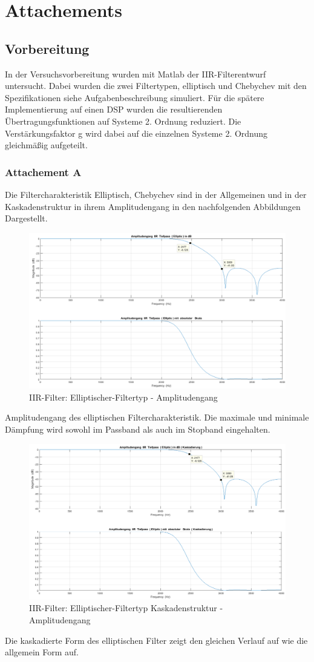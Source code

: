 \section{Attachements}
\subsection{Vorbereitung}
In der Versuchsvorbereitung wurden mit Matlab der IIR-Filterentwurf untersucht. Dabei wurden die zwei Filtertypen, elliptisch und Chebychev mit den Spezifikationen siehe Aufgabenbeschreibung simuliert. Für die spätere Implementierung auf einen DSP wurden die resultierenden Übertragungsfunktionen auf Systeme 2. Ordnung reduziert. Die Verstärkungsfaktor g wird dabei auf die einzelnen Systeme 2. Ordnung gleichmäßig aufgeteilt.
\subsubsection{Attachement A}

Die Filtercharakteristik Elliptisch, Chebychev sind in der Allgemeinen und in der Kaskadenstruktur in ihrem Amplitudengang in den nachfolgenden Abbildungen Dargestellt.

\begin{figure}[h]
\centering
\includegraphics[width=0.7\linewidth]{Bilder/Attachment_A_ELLIP}
\caption{IIR-Filter: Elliptischer-Filtertyp - Amplitudengang}
\label{fig:Attachment_A_ELLIP}
\end{figure}
\noindent Amplitudengang des elliptischen Filtercharakteristik. Die maximale und minimale Dämpfung wird sowohl im Passband als auch im Stopband eingehalten.

\clearpage

\begin{figure}[h]
	\centering
	\includegraphics[width=0.7\linewidth]{Bilder/Attachment_A_ELLIP_KASKADE}
	\caption{IIR-Filter: Elliptischer-Filtertyp Kaskadenstruktur - Amplitudengang}
	\label{fig:Attachment_A_ELLIP_KASKADE}
\end{figure}
\noindent Die kaskadierte Form des elliptischen Filter zeigt den gleichen Verlauf auf wie die allgemein Form auf.

